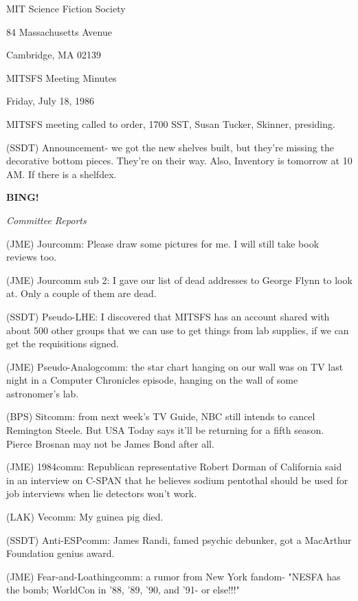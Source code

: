 \documentclass[12pt]{article}
\newcommand{\bing}{{\bf BING!} }
\newcommand{\goto}[1]{\bing \vskip 12pt \centerline{{\em{#1}}}}
\begin{document}
\begin{center}

MIT Science Fiction Society 

84 Massachusetts Avenue

Cambridge, MA 02139

\vspace{12pt}

MITSFS Meeting Minutes 

Friday, July 18, 1986

\end{center}
 
\vspace{18pt}

\setlength{\parskip}{6pt}

\noindent
MITSFS meeting called to order, 1700 SST,
Susan Tucker, Skinner, presiding.

(SSDT) Announcement- we got the new shelves built, but they're missing the decorative bottom pieces. They're on their way. Also, Inventory is tomorrow at 10 AM. If there is a shelfdex.

\goto{Committee Reports}

(JME) Jourcomm: Please draw some pictures for me. I will still take book reviews too.

(JME) Jourcomm sub 2: I gave our list of dead addresses to George Flynn to look at. Only a couple of them are dead.

(SSDT) Pseudo-LHE: I discovered that MITSFS has an account shared with about 500 other groups that we can use to get things from lab supplies, if we can get the requisitions signed.

(JME) Pseudo-Analogcomm: the star chart hanging on our wall was on TV last night in a Computer Chronicles episode, hanging on the wall of some astronomer's lab.

(BPS) Sitcomm: from next week's TV Guide, NBC still intends to cancel Remington Steele. But USA Today says it'll be returning for a fifth season. Pierce Brosnan may not be James Bond after all.

(JME) 1984comm: Republican representative Robert Dorman of California said in an interview on C-SPAN that he believes sodium pentothal should be used for job interviews when lie detectors won't work.

(LAK) Vecomm: My guinea pig died.

(SSDT) Anti-ESPcomm: James Randi, famed psychic debunker, got a MacArthur Foundation genius award.

(JME) Fear-and-Loathingcomm: a rumor from New York fandom- "NESFA has the bomb; WorldCon in '88, '89, '90, and '91- or else!!!"
\end{document}
